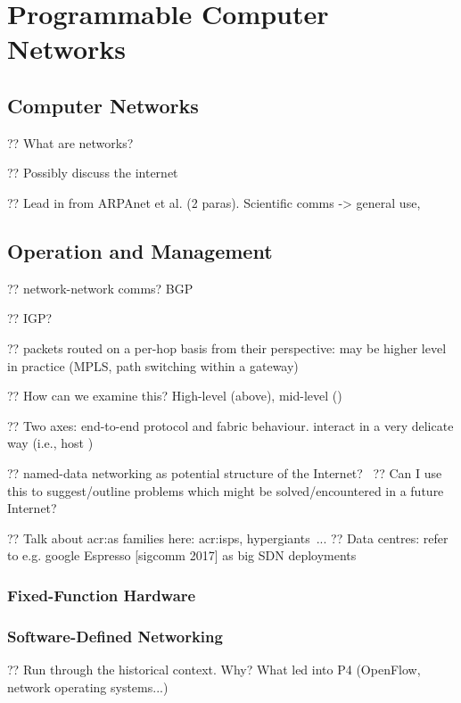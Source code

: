 \chapter{Programmable Computer Networks}\label{sec:ch-networks}\label{chap:nets}
\section{Computer Networks}

?? What are networks?

?? Possibly discuss the internet

?? Lead in from ARPAnet et al. (2 paras). Scientific comms -> general use,

\section{Operation and Management}

?? network-network comms? BGP

?? IGP?

?? packets routed on a per-hop basis from their perspective: may be higher level in practice (MPLS, path switching within a gateway)

?? How can we examine this? High-level (above), mid-level ()

?? Two axes: end-to-end protocol and fabric behaviour. interact in a very delicate way (i.e., host )

?? named-data networking as potential structure of the Internet?~\parencite{DBLP:journals/ccr/0001ABJcCPWZ14}
?? Can I use this to suggest/outline problems which might be solved/encountered in a future Internet?

?? Talk about \gls{acr:as} families here: \glspl{acr:isp}, hypergiants~\parencite{DBLP:conf/sigcomm/GigisCMNKDKS21}...
?? Data centres: refer to e.g. google Espresso [sigcomm 2017] as big SDN deployments

\subsection{Fixed-Function Hardware}

\subsection{Software-Defined Networking}

?? Run through the historical context. Why? What led into P4 (OpenFlow, network operating systems...)

